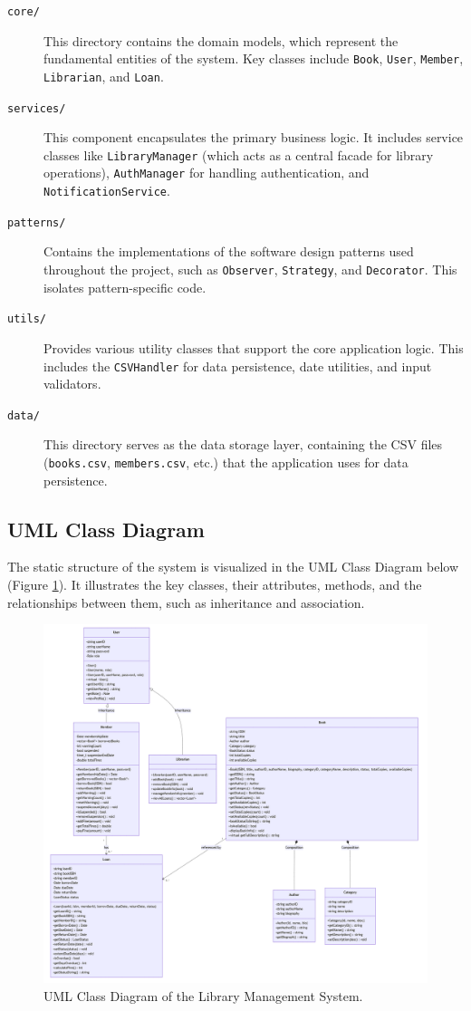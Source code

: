 \begin{description}
    \item[\texttt{core/}] This directory contains the domain models, which represent the fundamental entities of the system. Key classes include \texttt{Book}, \texttt{User}, \texttt{Member}, \texttt{Librarian}, and \texttt{Loan}.
    \item[\texttt{services/}] This component encapsulates the primary business logic. It includes service classes like \texttt{LibraryManager} (which acts as a central facade for library operations), \texttt{AuthManager} for handling authentication, and \texttt{NotificationService}.
    \item[\texttt{patterns/}] Contains the implementations of the software design patterns used throughout the project, such as \texttt{Observer}, \texttt{Strategy}, and \texttt{Decorator}. This isolates pattern-specific code.
    \item[\texttt{utils/}] Provides various utility classes that support the core application logic. This includes the \texttt{CSVHandler} for data persistence, date utilities, and input validators.
    \item[\texttt{data/}] This directory serves as the data storage layer, containing the CSV files (\texttt{books.csv}, \texttt{members.csv}, etc.) that the application uses for data persistence.
\end{description}

\subsection{UML Class Diagram}
The static structure of the system is visualized in the UML Class Diagram below \cite{Booch2005} (Figure \ref{fig:class_diagram}). It illustrates the key classes, their attributes, methods, and the relationships between them, such as inheritance and association.

\begin{figure}[H]
    \centering
    \includegraphics[width=\textwidth]{figures/class_diagram.png}
    \caption{UML Class Diagram of the Library Management System.}
    \label{fig:class_diagram}
\end{figure}